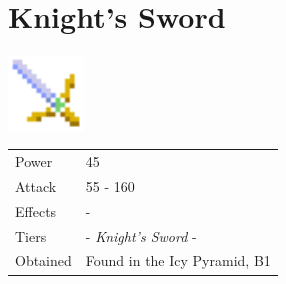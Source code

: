 \section{Knight's Sword}
\label{weapon:knights_sword}

\includegraphics[height=2cm,keepaspectratio]{./resources/weapons/knightssword}

\begin{longtable}{ l p{9cm} }
	Power
	& 45
\\ %
	Attack
	& 55 - 160
\\ %
	Effects
	& -
\\ %
	Tiers
	& \nameref{weapon:steel_sword} - \textit{Knight's Sword} - \nameref{weapon:excalibur}
\\ %
	Obtained
	& Found in the Icy Pyramid, B1
\end{longtable}
